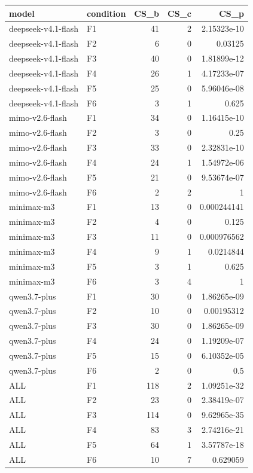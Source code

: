 \begin{tabular}{llrrr}
\toprule
model & condition & CS\_b & CS\_c & CS\_p \\
\midrule
deepseek-v4.1-flash & F1 & 41 & 2 & 2.15323e-10 \\
deepseek-v4.1-flash & F2 & 6 & 0 & 0.03125 \\
deepseek-v4.1-flash & F3 & 40 & 0 & 1.81899e-12 \\
deepseek-v4.1-flash & F4 & 26 & 1 & 4.17233e-07 \\
deepseek-v4.1-flash & F5 & 25 & 0 & 5.96046e-08 \\
deepseek-v4.1-flash & F6 & 3 & 1 & 0.625 \\
mimo-v2.6-flash & F1 & 34 & 0 & 1.16415e-10 \\
mimo-v2.6-flash & F2 & 3 & 0 & 0.25 \\
mimo-v2.6-flash & F3 & 33 & 0 & 2.32831e-10 \\
mimo-v2.6-flash & F4 & 24 & 1 & 1.54972e-06 \\
mimo-v2.6-flash & F5 & 21 & 0 & 9.53674e-07 \\
mimo-v2.6-flash & F6 & 2 & 2 & 1 \\
minimax-m3 & F1 & 13 & 0 & 0.000244141 \\
minimax-m3 & F2 & 4 & 0 & 0.125 \\
minimax-m3 & F3 & 11 & 0 & 0.000976562 \\
minimax-m3 & F4 & 9 & 1 & 0.0214844 \\
minimax-m3 & F5 & 3 & 1 & 0.625 \\
minimax-m3 & F6 & 3 & 4 & 1 \\
qwen3.7-plus & F1 & 30 & 0 & 1.86265e-09 \\
qwen3.7-plus & F2 & 10 & 0 & 0.00195312 \\
qwen3.7-plus & F3 & 30 & 0 & 1.86265e-09 \\
qwen3.7-plus & F4 & 24 & 0 & 1.19209e-07 \\
qwen3.7-plus & F5 & 15 & 0 & 6.10352e-05 \\
qwen3.7-plus & F6 & 2 & 0 & 0.5 \\
ALL & F1 & 118 & 2 & 1.09251e-32 \\
ALL & F2 & 23 & 0 & 2.38419e-07 \\
ALL & F3 & 114 & 0 & 9.62965e-35 \\
ALL & F4 & 83 & 3 & 2.74216e-21 \\
ALL & F5 & 64 & 1 & 3.57787e-18 \\
ALL & F6 & 10 & 7 & 0.629059 \\
\bottomrule
\end{tabular}
